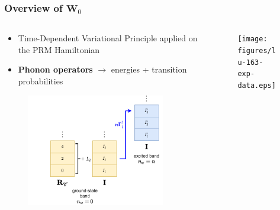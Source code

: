 \documentclass{beamer}
\begin{document}
\begin{frame}
	\frametitle{Overview of $\mathbf{W}_0$}
	\vspace{-0.3cm}
	\begin{columns}
		\begin{column}{0.6\textwidth}
			\begin{itemize}
				\item Time-Dependent Variational Principle applied on the PRM Hamiltonian
				\item \textbf{Phonon operators} $\rightarrow$ energies + transition probabilities
			\end{itemize}
			\vspace{-0.5cm}
			\begin{figure}
				\centering
				\includegraphics[width=0.9\textwidth]{figures/w0_phonon_operator.pdf}
			\end{figure}
		\end{column}
		\begin{column}{0.4\textwidth}
			\begin{figure}
				\centering
				\texttt{[image: figures/lu-163-exp-data.eps]}
			\end{figure}
		\end{column}
	\end{columns}
\end{frame}
\end{document}
